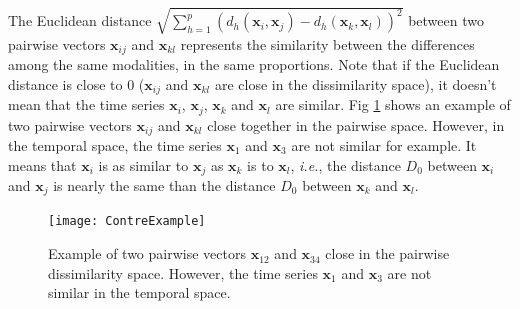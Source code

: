The Euclidean distance $\sqrt{\sum\limits_{h=1}^{p} (d_h(\textbf{x}_{i},\textbf{x}_{j})-d_h(\textbf{x}_{k},\textbf{x}_{l}))^2}$ between two pairwise vectors $\textbf{x}_{ij}$ and $\textbf{x}_{kl}$ represents the similarity between the differences among the same modalities, in the same proportions. Note that if the Euclidean distance is close to 0 ($\textbf{x}_{ij}$ and $\textbf{x}_{kl}$ are close in the dissimilarity space), it doesn't mean that the time series $\textbf{x}_{i}$, $\textbf{x}_{j}$, $\textbf{x}_{k}$ and $\textbf{x}_{l}$ are similar. Fig \ref{fig:ContreExample} shows an example of two pairwise vectors $\textbf{x}_{ij}$ and $\textbf{x}_{kl}$ close together in the pairwise space. However, in the temporal space, the time series $\textbf{x}_{1}$ and $\textbf{x}_{3}$ are not similar for example. It means that $\textbf{x}_i$ is as similar to $\textbf{x}_j$ as $\textbf{x}_k$ is to $\textbf{x}_l$, \textit{i.e.}, the distance $D_0$ between $\textbf{x}_i$ and $\textbf{x}_j$ is nearly the same than the distance $D_0$ between $\textbf{x}_k$ and $\textbf{x}_l$.

\begin{figure}[h!]
	\centering
	\texttt{[image: ContreExample]}
	\caption{Example of two pairwise vectors $\textbf{x}_{12}$ and $\textbf{x}_{34}$ close in the pairwise dissimilarity space. However, the time series $\textbf{x}_{1}$ and $\textbf{x}_{3}$ are not similar in the temporal space.}
	\label{fig:ContreExample}
\end{figure}


